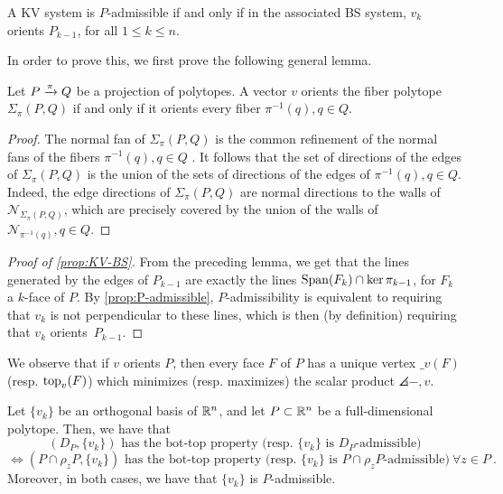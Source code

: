 \begin{proposition}
	\label{prop:KV-BS}
	A KV system is $P$-admissible if and only if in the associated BS system, $v_k$ orients $P_{k-1}$, for all $1\leq k \leq n$.
\end{proposition}

In order to prove this, we first prove the following general lemma.

\begin{lemma} \label{lemma:orients-the-fibers}
	Let $P \xrightarrow{\pi} Q$ be a projection of polytopes.
	A vector $v$ orients the fiber polytope $\Sigma_\pi(P,Q)$ if and only if it orients every fiber $\pi^{-1}(q), q \in Q$.
\end{lemma}

\begin{proof}
	The normal fan of $\Sigma_\pi(P,Q)$ is the common refinement of the normal fans of the fibers $\pi^{-1}(q), q \in Q$ \cite[Proposition 2.2]{BilleraSturmfels94}.
	It follows that the set of directions of the edges of $\Sigma_\pi(P,Q)$ is the union of the sets of directions of the edges of $\pi^{-1}(q), q \in Q$.
	Indeed, the edge directions of $\Sigma_\pi(P,Q)$ are normal directions to the walls of $\mathcal{N}_{\Sigma_\pi(P,Q)}$, which are precisely covered by the union of the walls of $\mathcal{N}_{\pi^{-1}(q)}, q \in Q$.
\end{proof}

\begin{proof}[Proof of \cref{prop:KV-BS}]
	From the preceding lemma, we get that the lines generated by the edges of $P_{k-1}$ are exactly the lines $\operatorname{\mathrm{Span}}(F_k)\cap \ker \pi_{k-1}$, for $F_k$ a $k$-face of $P$.
	By \cref{prop:P-admissible}, $P$-admissibility is equivalent to requiring that $v_k$ is not perpendicular to these lines, which is then (by definition) requiring that $v_k$ orients~$P_{k-1}$.
\end{proof}

We observe that if $v$ orients $P$, then every face $F$ of $P$ has a unique vertex $\bm_v(F)$ (resp. $\operatorname{top}_v(F)$) which minimizes (resp. maximizes) the scalar product $\angles{-,v}$.



\begin{proposition}
	Let $\{v_k\}$ be an orthogonal basis of $\mathbb{R}^n$, and let $P\subset \mathbb{R}^n$ be a full-dimensional polytope.
	Then, we have that
	\[
	(D_P,\{v_k\}) \text{ has the bot-top property (resp. } \{v_k\} \text{ is }D_P\text{-admissible)}
	\]
	\[
	\iff (P\cap \rho_z P,\{v_k\}) \text{ has the bot-top property (resp. } \{v_k\} \text{ is }P\cap \rho_z P\text{-admissible)} \ \forall z \in P \ .
	\]
	Moreover, in both cases, we have that $\{v_k\}$ is $P$-admissible.
\end{proposition}


